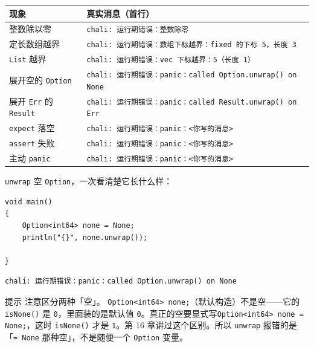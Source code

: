 \begin{center}
\begin{tabular}{ll}
\toprule
现象 & 真实消息（首行） \\
\midrule
整数除以零 & \texttt{chali:\allowbreak{} 运行期错误：整数除零} \\
定长数组越界 & \texttt{chali:\allowbreak{} 运行期错误：数组下标越界：fixed 的下标 5，长度 3} \\
\texttt{List} 越界 & \texttt{chali:\allowbreak{} 运行期错误：vec 下标越界：5（长度 1）} \\
展开空的 \texttt{Option} & \texttt{chali:\allowbreak{} 运行期错误：panic：called Option.\allowbreak{}unwrap(\allowbreak{})\allowbreak{} on None} \\
展开 \texttt{Err} 的 \texttt{Result} & \texttt{chali:\allowbreak{} 运行期错误：panic：called Result.\allowbreak{}unwrap(\allowbreak{})\allowbreak{} on Err} \\
\texttt{expect} 落空 & \texttt{chali:\allowbreak{} 运行期错误：panic：<\allowbreak{}你写的消息>\allowbreak{}} \\
\texttt{assert} 失败 & \texttt{chali:\allowbreak{} 运行期错误：panic：<\allowbreak{}你写的消息>\allowbreak{}} \\
主动 \texttt{panic} & \texttt{chali:\allowbreak{} 运行期错误：panic：<\allowbreak{}你写的消息>\allowbreak{}} \\
\bottomrule
\end{tabular}
\end{center}

\texttt{unwrap} 空 \texttt{Option}，一次看清楚它长什么样：

\par
\medskip
\begin{lstlisting}[style=chali]
void main()
{
    Option<int64> none = None;
    println("{}", none.unwrap());

}
\end{lstlisting}
\par
\medskip

\par
\medskip
\begin{lstlisting}[style=out]
chali: 运行期错误：panic：called Option.unwrap() on None
\end{lstlisting}
\par
\medskip

\begin{tip}{提示}
注意区分两种「空」。 \texttt{Option<\allowbreak{}int64>\allowbreak{} none;}（默认构造）不是空——它的 \texttt{is\allowbreak{}None(\allowbreak{})\allowbreak{}} 是 \texttt{0}，里面装的是默认值 \texttt{0}。真正的空要显式写\texttt{Option<\allowbreak{}int64>\allowbreak{} none =\allowbreak{} None;}，这时 \texttt{is\allowbreak{}None(\allowbreak{})\allowbreak{}} 才是 \texttt{1}。第 16 章讲过这个区别。所以 \texttt{unwrap} 报错的是「\texttt{=\allowbreak{} None} 那种空」，不是随便一个 \texttt{Option} 变量。
\end{tip}

